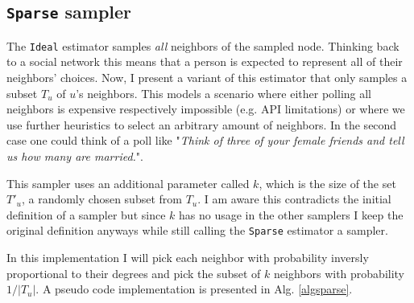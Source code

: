 \subsection{\texttt{Sparse} sampler}
The \texttt{Ideal} estimator samples \textit{all} neighbors of the sampled node. Thinking back to a social network this means that a person is expected to represent all of their neighbors' choices.
Now, I present a variant of this estimator that only samples a subset $T_u$ of $u$'s neighbors.
This models a scenario where either polling all neighbors is expensive respectively impossible (e.g. API limitations) or where we use further heuristics to select an arbitrary amount of neighbors. In the second case one could think of a poll like "\textit{Think of three of your female friends and tell us how many are married.}".

This sampler uses an additional parameter called $k$, which is the size of the set $T'_u$, a randomly chosen subset from $T_u$.
I am aware this contradicts the initial definition of a sampler but since $k$ has no usage in the other samplers I keep the original definition anyways while still calling the \texttt{Sparse} estimator a sampler.

In this implementation I will pick each neighbor with probability inversly proportional to their degrees and pick the subset of $k$ neighbors with probability $1/|T_u|$.
A pseudo code implementation is presented in Alg. \ref{algsparse}.

